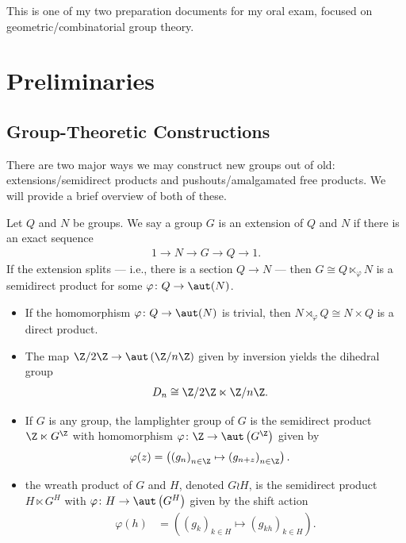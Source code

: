 \documentclass[10pt]{mypackage}
\begin{document}
\RaggedRight
This is one of my two preparation documents for my oral exam, focused on geometric/combinatorial group theory.
\tableofcontents
\section{Preliminaries}%
\subsection{Group-Theoretic Constructions}%
There are two major ways we may construct new groups out of old: extensions/semidirect products and pushouts/amalgamated free products. We will provide a brief overview of both of these.
\begin{definition}
  Let $Q$ and $N$ be groups. We say a group $G$ is an extension of $Q$ and $N$ if there is an exact sequence
  \begin{align*}
    1 \rightarrow N\rightarrow G\rightarrow Q\rightarrow 1.
  \end{align*}
  If the extension splits --- i.e., there is a section $Q\rightarrow N$ --- then $G\cong Q\ltimes_{\varphi}N$ is a semidirect product for some $\varphi\colon Q\rightarrow \aut(N)$.
\end{definition}
\begin{example}\hfill
  \begin{itemize}
    \item If the homomorphism $\varphi\colon Q\rightarrow \aut(N)$ is trivial, then $N\rtimes_{\varphi}Q\cong N\times Q$ is a direct product.
    \item The map $\Z/2\Z\rightarrow \aut\left( \Z/n\Z \right)$ given by inversion yields the dihedral group
      \begin{align*}
        D_n &\cong \Z/2\Z\ltimes \Z/n\Z.
      \end{align*}
    \item If $G$ is any group, the lamplighter group of $G$ is the semidirect product $\Z\ltimes G^{\Z}$ with homomorphism $\varphi\colon \Z\rightarrow \aut\left( G^{\Z} \right)$ given by
      \begin{align*}
        \varphi(z) &= \left( \left( g_n \right)_{n\in \Z}\mapsto \left( g_{n + z} \right)_{n\in \Z} \right).
      \end{align*}
    \item the wreath product of $G$ and $H$, denoted $G\wr H$, is the semidirect product $H\ltimes G^{H}$ with $\varphi\colon H\rightarrow \aut\left( G^{H} \right)$ given by the shift action
      \begin{align*}
        \varphi(h) &= \left( \left( g_k \right)_{k\in H}\mapsto \left( g_{kh} \right)_{k\in H} \right).
      \end{align*}
  \end{itemize}
\end{example}
\end{document}
